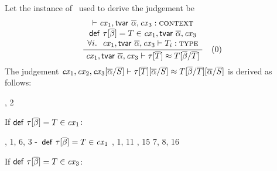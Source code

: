 \begin{bycase}
\Case{\Rtedef}\\
Let the instance of \Rtedef\ used to derive the judgement be
\[
\frac{\begin{array}{c}\vdash\mathit{cx}_1,\mathsf{tvar}\ \overline{\alpha},\mathit{cx}_3:\textsc{context}\\\mathsf{def}\ \tau[\overline{\beta}]=T\in\mathit{cx}_1,\mathsf{tvar}\ \overline{\alpha},\mathit{cx}_3\\\forall i.\ \ \mathit{cx}_1,\mathsf{tvar}\ \overline{\alpha},\mathit{cx}_3\vdash T_i:\textsc{type}\end{array}}{\mathit{cx}_1,\mathsf{tvar}\ \overline{\alpha},\mathit{cx}_3\vdash\tau[\overline{T}]\approx T[\overline{\beta}/\overline{T}]}\quad\mbox{(0)}
\]
The judgement
$\mathit{cx}_1,\mathit{cx}_2,\mathit{cx}_3[\overline{\alpha}/\overline{S}]\vdash\tau[\overline{T}][\overline{\alpha}/\overline{S}]\approx T[\overline{\beta}/\overline{T}][\overline{\alpha}/\overline{S}]$
is derived as follows:
\begin{derivation}
     {\indhyp, 2}
\end{derivation}
If $\mathsf{def}\ \tau[\overline{\beta}]=T\in\mathit{cx}_1$:
\begin{derivatioN}{5}
     {\Rtedef, 1, 6, 3}
\step{\tinst{\tnam}{\tsbslash{\typS}{\tvarIS}{\typIS}}=
      \tsbslash{\tinstO}{\tvarIS}{\typIS}}
     {}
     {\hyp\ $\mathsf{def}\ \tau[\overline{\beta}]=T\in\mathit{cx}_1$}
     {, 1, 11}
\step{\tsbslash{\tsbslash{\typ}{\tvarS}{\typS}}{\tvarIS}{\typIS}=
      \tsbslash{\typ}{\tvarS}{\tsbslash{\typS}{\tvarIS}{\typIS}}}
     {, 15}
     {7, 8, 16}
\end{derivatioN}
If $\mathsf{def}\ \tau[\overline{\beta}]=T\in\mathit{cx}_3$:
\begin{derivatioN}{5}

\end{derivatioN}
\end{bycase}
